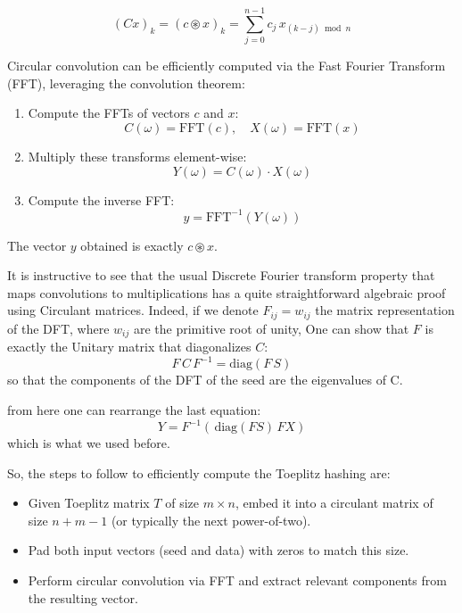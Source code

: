 \[
(Cx)_k = (c \circledast x)_k = \sum_{j=0}^{n-1} c_j \, x_{(k - j) \bmod n}
\]


Circular convolution can be efficiently computed via the Fast Fourier Transform (FFT), leveraging the convolution theorem:

\begin{enumerate}
    \item Compute the FFTs of vectors \( c \) and \( x \):
    \[
    C(\omega) = \text{FFT}(c), \quad X(\omega) = \text{FFT}(x)
    \]

    \item Multiply these transforms element-wise:
    \[
    Y(\omega) = C(\omega) \cdot X(\omega)
    \]

    \item Compute the inverse FFT:
    \[
    y = \text{FFT}^{-1}(Y(\omega))
    \]
\end{enumerate}

The vector \( y \) obtained is exactly \( c \circledast x \).

It is instructive to see that the usual Discrete Fourier transform property that maps convolutions to multiplications has a quite straightforward algebraic proof using Circulant matrices. Indeed, if we denote $F_{ij} = w_{ij}$ the matrix representation of the DFT, where $w_{ij}$ are the primitive root of unity, One can show that $F$ is exactly the Unitary matrix that diagonalizes $C$:
\begin{equation}
	F\,C\,F^{-1} = \text{diag}(F\,S)
\end{equation}
so that the components of the DFT of the seed are the eigenvalues of C.

from here one can rearrange the last equation:
\begin{equation}
Y = F^{-1} (\,\text{diag}(FS) \,FX)
\end{equation}
which is what we used before.


So, the steps to follow to efficiently compute the Toeplitz hashing are:

\begin{itemize}
    \item Given Toeplitz matrix \(T\) of size \(m \times n\), embed it into a circulant matrix of size \(n+m-1\) (or typically the next power-of-two).
    \item Pad both input vectors (seed and data) with zeros to match this size.
    \item Perform circular convolution via FFT and extract relevant components from the resulting vector.
\end{itemize}


